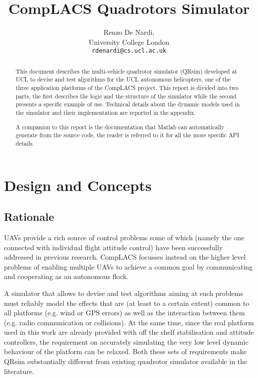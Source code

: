 \documentclass[a4paper,11pt]{report}
\title{{CompLACS} Quadrotors Simulator}
\author{Renzo De Nardi,\\University College London\\\texttt{rdenardi@cs.ucl.ac.uk}}
\newcommand{\sname}{QRsim\xspace}
\begin{document}
\maketitle

\begin{abstract}
This document describes the multi-vehicle quadrotor simulator (\sname) developed at UCL to devise and test algorithms for the UCL autonomous helicopters, one of the three application platforms of the {CompLACS} project.
This report is divided into two parts, the first describes the logic and the structure of the simulator while the second presents a specific example of use. 
Technical details about the dynamic models used in the simulator and their implementation are reported in the appendix. 

A companion to this report is the documentation that Matlab can automatically generate from the source code, the reader is referred to it for all the more specific API details.
\end{abstract}

\tableofcontents

\chapter{Design and Concepts}

\section{Rationale}
UAVs provide a rich source of control problems some of which (namely the one connected with individual flight attitude control) have been successfully addressed in previous research. {CompLACS} focusses instead on the higher level problems of enabling multiple UAVs to achieve a common goal by communicating and cooperating as an autonomous flock. 

A simulator that allows to devise and test algorithms aiming at such problems must reliably model the effects that are (at least to a certain extent) common to all platforms (e.g. wind or GPS errors) as well as the interaction between them (e.g. radio communication or collisions). 
At the same time, since the real platform used in this work are already provided with off the shelf stabilisation and attitude controllers, the requirement on accurately simulating the very low level dynamic behaviour of the platform can be relaxed.
Both these sets of requirements make \sname substantially different from existing quadrotor simulator available in the literature. 
\end{document}
